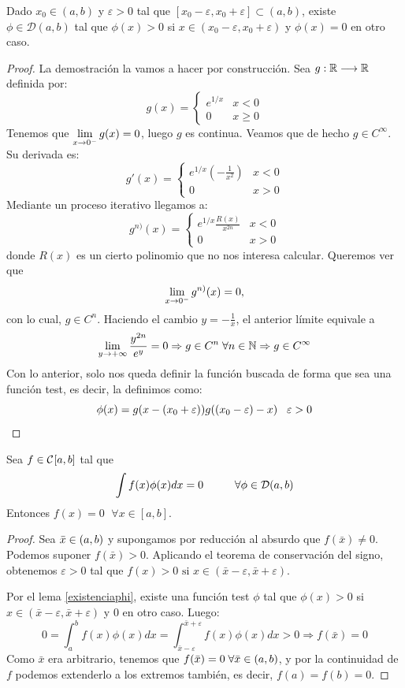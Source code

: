 \begin{lemma}
\label{existenciaphi}
Dado $x_0\in(a,b)$ y $\varepsilon>0$ tal que $[x_0-\varepsilon, x_0+\varepsilon]\subset(a,b)$, existe $\phi\in\mathcal{D}(a,b)$ tal que $\phi(x)>0$ si $x\in(x_0-\varepsilon,x_0+\varepsilon)$ y $\phi(x)=0$ en otro caso.
\end{lemma}

\begin{proof}
La demostración la vamos a hacer por construcción. Sea $g : \mathbb{R} \longrightarrow \mathbb{R}$ definida por:
\[
g(x)=\left\{
\begin{array}{cc}
e^{1/x} & x<0 \\
0 & x\geq 0
\end{array}
\right.
\]
Tenemos que $\displaystyle\lim_{ x \to 0^- } g(x)=0$, luego $g$ es continua. Veamos que de hecho $g\in C^{\infty}$. Su derivada es:
\[
g'(x)=\left\{
\begin{array}{cc}
e^{1/x}\left(-\frac{1}{x^2}\right) & x<0 \\
0 & x> 0
\end{array}
\right.
\]
Mediante un proceso iterativo llegamos a:
\[
g^{n)}(x)=\left\{
\begin{array}{cc}
e^{1/x}\frac{R(x)}{x^{2n}} & x<0 \\
0 & x> 0
\end{array}
\right.
\]
donde $R(x)$ es un cierto polinomio que no nos interesa calcular. Queremos ver que 
\[\displaystyle\lim_{ x \to 0^- } g^{n)}(x)=0,\]
con lo cual, $g\in C^n$. Haciendo el cambio $y=-\frac{1}{x}$, el anterior límite equivale a 
\[
\displaystyle\lim_{ y \to +\infty } \frac{y^{2n}}{e^y}=0 \Rightarrow g\in C^{n} \;\forall n \in\mathbb{N} \Rightarrow g\in C^{\infty}
\]
Con lo anterior, solo nos queda definir la función buscada de forma que sea una función test, es decir, la definimos como:
\[
\phi(x)=g(x-(x_0+\varepsilon))g((x_0-\varepsilon)-x) \;\;\; \varepsilon>0 
\]

\end{proof}


\begin{theorem}
\label{theorem:1.3}
Sea $f\in \mathcal{C}^{  }[a,b]$ tal que
\[
\int f(x)\phi(x)dx=0 \hspace{1cm} \forall \phi \in \mathcal{D}(a,b)
\]
Entonces $f(x)=0 \;$  $\forall x\in [a,b]$.
\end{theorem}

\begin{proof}
Sea $\bar{x}\in (a,b)$ y supongamos por reducción al absurdo que $f(\bar{x})\neq 0$. Podemos suponer $f(\bar{x})>0$. Aplicando el teorema de conservación del signo, obtenemos $\varepsilon>0$ tal que $f(x)>0 \text{ si } x \in (\bar{x}-\varepsilon,\bar{x}+\varepsilon)$.

Por el lema \ref{existenciaphi}, existe una función test $\phi$ tal que $\phi(x)>0$ si $x\in(\bar{x}-\varepsilon, \bar{x}+\varepsilon)$ y $0$ en otro caso. Luego:
\[
0=\int_{a}^{b}f(x)\phi(x)dx=\int_{\bar{x}-\varepsilon}^{\bar{x}+\varepsilon}f(x)\phi(x)dx>0 \Rightarrow f(\bar{x})=0
\]
Como $\bar{x}$ era arbitrario, tenemos que $f(\bar{x})=0 \; \forall \bar{x}\in(a,b)$, y por la continuidad de $f$ podemos extenderlo a los extremos también, es decir, $f(a)=f(b)=0$.

\end{proof}


